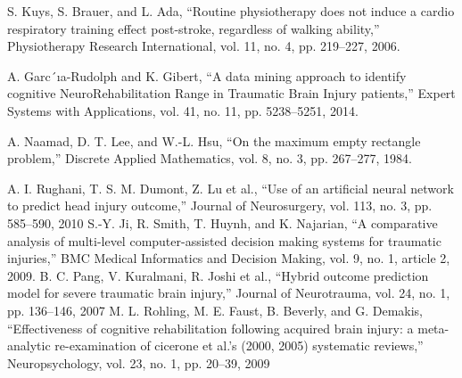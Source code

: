 \begin{thebibliography}{31}
 S. Kuys, S. Brauer, and L. Ada, “Routine physiotherapy does not
induce a cardio respiratory training effect post-stroke, regardless
of walking ability,” Physiotherapy Research International, vol. 11,
no. 4, pp. 219–227, 2006.

 A. Garc´ıa-Rudolph and K. Gibert, “A data mining approach
to identify cognitive NeuroRehabilitation Range in Traumatic
Brain Injury patients,” Expert Systems with Applications, vol. 41,
no. 11, pp. 5238–5251, 2014.

A. Naamad, D. T. Lee, and W.-L. Hsu, “On the maximum empty
rectangle problem,” Discrete Applied Mathematics, vol. 8, no. 3,
pp. 267–277, 1984.

A. I. Rughani, T. S. M. Dumont, Z. Lu et al., “Use of an artificial
neural network to predict head injury outcome,” Journal of
Neurosurgery, vol. 113, no. 3, pp. 585–590, 2010
S.-Y. Ji, R. Smith, T. Huynh, and K. Najarian, “A comparative analysis of multi-level computer-assisted decision making
systems for traumatic injuries,” BMC Medical Informatics and
Decision Making, vol. 9, no. 1, article 2, 2009.
 B. C. Pang, V. Kuralmani, R. Joshi et al., “Hybrid outcome
prediction model for severe traumatic brain injury,” Journal of
Neurotrauma, vol. 24, no. 1, pp. 136–146, 2007
 M. L. Rohling, M. E. Faust, B. Beverly, and G. Demakis,
“Effectiveness of cognitive rehabilitation following acquired
brain injury: a meta-analytic re-examination of cicerone et al.’s
(2000, 2005) systematic reviews,” Neuropsychology, vol. 23, no.
1, pp. 20–39, 2009




\end{thebibliography}
